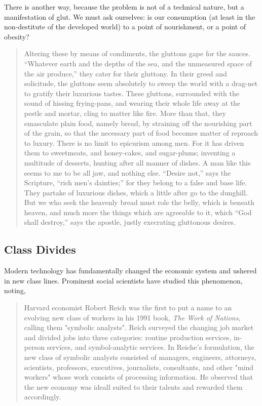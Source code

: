 \documentclass[letterpaper]{article}
\begin{document}
There is another way, because the problem is not of a technical nature, but a manifestation of glut. We must ask ourselves: is our consumption (at least in the non-destitute of the developed world) to a point of nourishment, or a point of obesity?


\begin{quote}
  Altering these by means of condiments, the gluttons gape for the sauces. “Whatever earth and the depths of the sea, and the unmeasured space of the air produce,” they cater for their gluttony. In their greed and solicitude, the gluttons seem absolutely to sweep the world with a drag-net to gratify their luxurious tastes. These gluttons, surrounded with the sound of hissing frying-pans, and wearing their whole life away at the pestle and mortar, cling to matter like fire. More than that, they emasculate plain food, namely bread, by straining off the nourishing part of the grain, so that the necessary part of food becomes matter of reproach to luxury. There is no limit to epicurism among men. For it has driven them to sweetmeats, and honey-cakes, and sugar-plums; inventing a multitude of desserts, hunting after all manner of dishes. A man like this seems to me to be all jaw, and nothing else. “Desire not,” says the Scripture, “rich men’s dainties;” for they belong to a false and base life. They partake of luxurious dishes, which a little after go to the dunghill. But we who seek the heavenly bread must role the belly, which is beneath heaven, and much more the things which are agreeable to it, which “God shall destroy,” says the apostle, justly execrating gluttonous desires.
\end{quote}

\subsection{Class Divides}

Modern technology has fundamentally changed the economic system and ushered in new class lines. Prominent social scientists have studied this phenomenon, noting,

\begin{quote}
  Harvard economist Robert Reich was the first to put a name to an evolving new class of workers in his 1991 book, \textit{The Work of Nations}, calling them "symbolic analysts". Reich surveyed the changing job market and divided jobs into three categories: routine production services, in-person services, and symbol-analytic services. In Reiche's formulation, the new class of symbolic analysts consisted of managers, engineers, attorneys, scientists, professors, executives, journalists, consultants, and other "mind workers" whose work consists of processing information. He observed that the new economy was ideall suited to their talents and rewarded them accordingly.
\end{quote}
\end{document}
